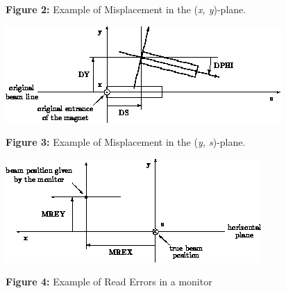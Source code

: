 \textbf{Figure 2:} Example of Misplacement in the (\textit{x, y})-plane. 

\includegraphics{figures/ys_align.png}

\textbf{Figure 3:} Example of Misplacement in the (\textit{y, s})-plane. 

\includegraphics{figures/monitor_read.png}

\textbf{Figure 4:} Example of Read Errors in a monitor 

